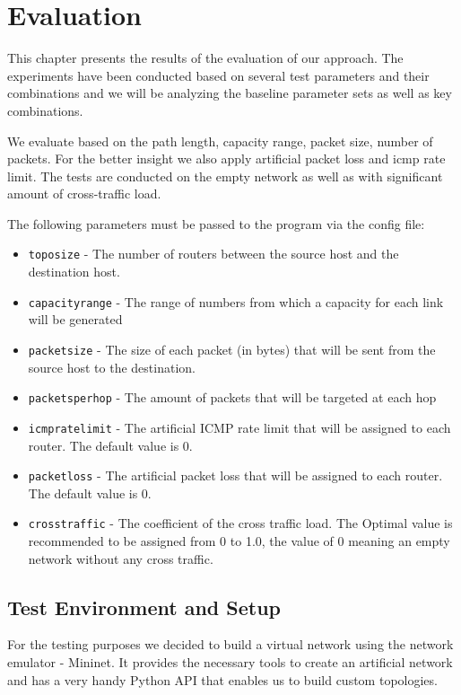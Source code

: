 \chapter{Evaluation}
This chapter presents the results of the evaluation of our approach. The experiments have been conducted based on several test parameters and their combinations and we will be analyzing the baseline parameter sets as well as key combinations. 

We evaluate based on the path length, capacity range, packet size, number of packets. For the better insight we also apply artificial packet loss and icmp rate limit. 
The tests are conducted on the empty network as well as with significant amount of cross-traffic load.

The following parameters must be passed to the program via the config file:
\begin{itemize}
	\item \texttt{topo\textunderscore size} - The number of routers between the source host and the destination host.
	\item \texttt{capacity\textunderscore range} - The range of numbers from which a capacity for each link will be generated
	\item \texttt{packet\textunderscore size} - The size of each packet (in bytes) that will be sent from the source host to the destination.
	\item \texttt{packets\textunderscore per\textunderscore hop} - The amount of packets that will be targeted at each hop
	\item \texttt{icmp\textunderscore ratelimit} - The artificial ICMP rate limit that will be assigned to each router. The default value is 0.
	\item \texttt{packet\textunderscore loss} - The artificial packet loss that will be assigned to each router. The default value is 0.
	\item \texttt{cross\textunderscore traffic} - The coefficient of the cross traffic load. The Optimal value is recommended to be assigned from 0 to 1.0, the value of 0 meaning an empty network without any cross traffic. 
\end{itemize}


\section{Test Environment and Setup}
For the testing purposes we decided to build a virtual network using the network emulator - Mininet\cite{mnHome}. It provides the necessary tools to create an artificial network and has a very handy Python API that enables us to build custom topologies.


